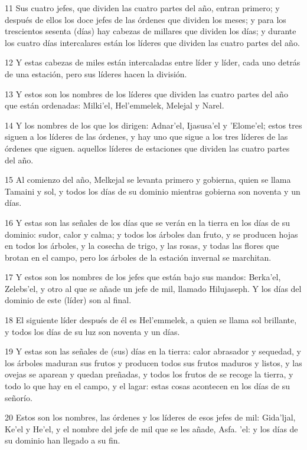 \par 11 Sus cuatro jefes, que dividen las cuatro partes del año, entran primero; y después de ellos los doce jefes de las órdenes que dividen los meses; y para los trescientos sesenta (días) hay cabezas de millares que dividen los días; y durante los cuatro días intercalares están los líderes que dividen las cuatro partes del año.
\par 12 Y estas cabezas de miles están intercaladas entre líder y líder, cada uno detrás de una estación, pero sus líderes hacen la división.
\par 13 Y estos son los nombres de los líderes que dividen las cuatro partes del año que están ordenadas: Milki'el, Hel'emmelek, Melejal y Narel.
\par 14 Y los nombres de los que los dirigen: Adnar'el, Ijasusa'el y 'Elome'el; estos tres siguen a los líderes de las órdenes, y hay uno que sigue a los tres líderes de las órdenes que siguen. aquellos líderes de estaciones que dividen las cuatro partes del año.
\par 15 Al comienzo del año, Melkejal se levanta primero y gobierna, quien se llama Tamaini y sol, y todos los días de su dominio mientras gobierna son noventa y un días.
\par 16 Y estas son las señales de los días que se verán en la tierra en los días de su dominio: sudor, calor y calma; y todos los árboles dan fruto, y se producen hojas en todos los árboles, y la cosecha de trigo, y las rosas, y todas las flores que brotan en el campo, pero los árboles de la estación invernal se marchitan.
\par 17 Y estos son los nombres de los jefes que están bajo sus mandos: Berka'el, Zelebs'el, y otro al que se añade un jefe de mil, llamado Hilujaseph. Y los días del dominio de este (líder) son al final.
\par 18 El siguiente líder después de él es Hel'emmelek, a quien se llama sol brillante, y todos los días de su luz son noventa y un días.
\par 19 Y estas son las señales de (sus) días en la tierra: calor abrasador y sequedad, y los árboles maduran sus frutos y producen todos sus frutos maduros y listos, y las ovejas se aparean y quedan preñadas, y todos los frutos de se recoge la tierra, y todo lo que hay en el campo, y el lagar: estas cosas acontecen en los días de su señorío.
\par 20 Estos son los nombres, las órdenes y los líderes de esos jefes de mil: Gida'ljal, Ke'el y He'el, y el nombre del jefe de mil que se les añade, Asfa. 'el: y los días de su dominio han llegado a su fin.

